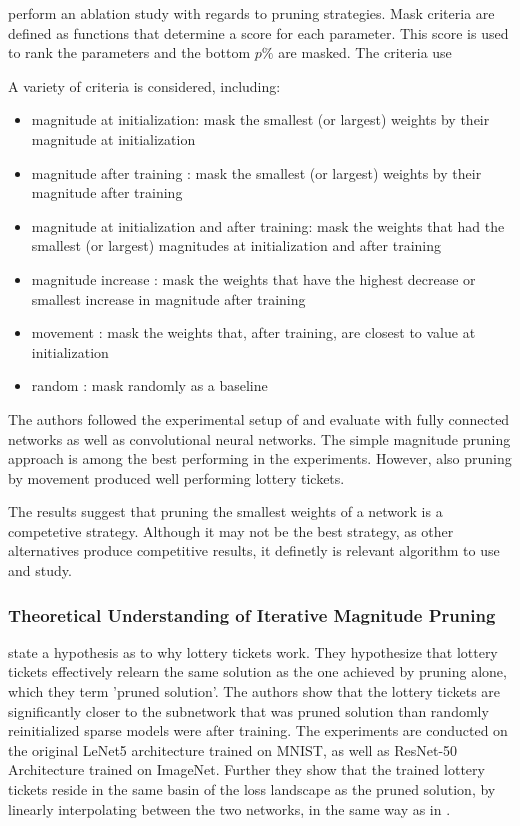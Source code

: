 \textcite{DBLP:conf/nips/ZhouLLY19} perform an ablation study with regards to pruning strategies. Mask criteria are defined as functions that determine a score for each parameter. This score is used to rank the parameters and the bottom $p\%$ are masked.
The criteria use 


A variety of criteria is considered, including: 
\begin{itemize}
  \item magnitude at initialization: mask the smallest (or largest) weights by their magnitude at initialization
  \item magnitude after training : mask the smallest (or largest) weights by their magnitude after training
  \item magnitude at initialization and after training: mask the weights that had the smallest (or largest) magnitudes at initialization and after training
  \item magnitude increase : mask the weights that have the highest decrease or smallest increase in magnitude after training
  \item movement : mask the weights that, after training, are closest to value at initialization
  \item random : mask randomly as a baseline
\end{itemize}

The authors followed the experimental setup of \textcite{DBLP:conf/iclr/FrankleC19} and evaluate with fully connected networks as well as convolutional neural networks. The simple magnitude pruning approach is among the best performing in the experiments. However, also pruning by movement produced well performing lottery tickets.

The results suggest that pruning the smallest weights of a network is a competetive strategy. Although it may not be the best strategy, as other alternatives produce competitive results, it definetly is relevant algorithm to use and study. 

\subsubsection{Theoretical Understanding of Iterative Magnitude Pruning}
\textcite{WhyLotteryTicketsWin} state a hypothesis as to why lottery tickets work. They hypothesize that lottery tickets effectively relearn the same solution as the one achieved by pruning alone, which they term 'pruned solution'.
The authors show that the lottery tickets are significantly closer to the subnetwork that was pruned solution than randomly reinitialized sparse models were after training. 
The experiments are conducted on the original LeNet5 architecture trained on MNIST, as well as ResNet-50 Architecture trained on ImageNet. Further they show that the trained lottery tickets reside in the same basin of the loss landscape as the pruned solution, by linearly interpolating between the two networks, in the same way as in \autocite{LinearModeConnectivity}.

